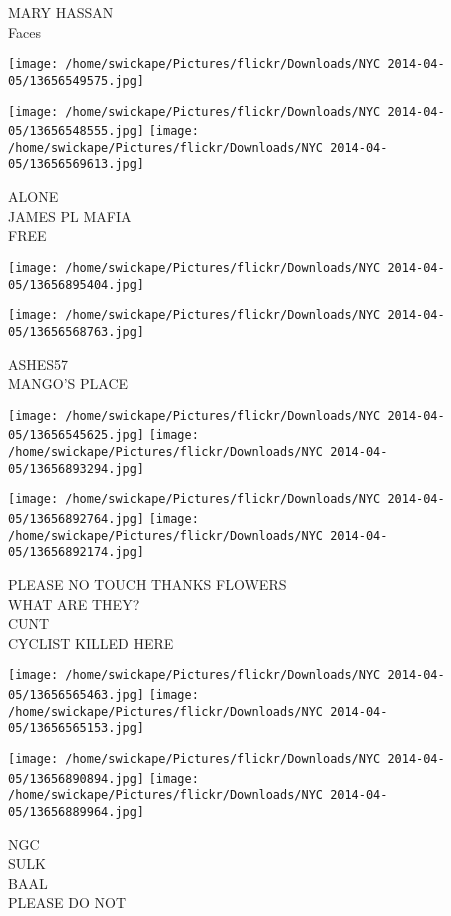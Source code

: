 \documentclass[10pt,letterpaper]{article}
\begin{document}
MARY HASSAN\\
Faces
\pagebreak

\texttt{[image: /home/swickape/Pictures/flickr/Downloads/NYC 2014-04-05/13656549575.jpg]}

\vspace{0.25in}
\texttt{[image: /home/swickape/Pictures/flickr/Downloads/NYC 2014-04-05/13656548555.jpg]}
\texttt{[image: /home/swickape/Pictures/flickr/Downloads/NYC 2014-04-05/13656569613.jpg]}

ALONE\\
JAMES PL MAFIA\\
FREE
\pagebreak

\texttt{[image: /home/swickape/Pictures/flickr/Downloads/NYC 2014-04-05/13656895404.jpg]}

\vspace{0.25in}
\texttt{[image: /home/swickape/Pictures/flickr/Downloads/NYC 2014-04-05/13656568763.jpg]}

ASHES57\\
MANGO'S PLACE
\pagebreak

\texttt{[image: /home/swickape/Pictures/flickr/Downloads/NYC 2014-04-05/13656545625.jpg]}
\texttt{[image: /home/swickape/Pictures/flickr/Downloads/NYC 2014-04-05/13656893294.jpg]}

\texttt{[image: /home/swickape/Pictures/flickr/Downloads/NYC 2014-04-05/13656892764.jpg]}
\texttt{[image: /home/swickape/Pictures/flickr/Downloads/NYC 2014-04-05/13656892174.jpg]}

PLEASE NO TOUCH THANKS FLOWERS\\
WHAT ARE THEY?\\
CUNT\\
CYCLIST KILLED HERE
\pagebreak

\texttt{[image: /home/swickape/Pictures/flickr/Downloads/NYC 2014-04-05/13656565463.jpg]}
\texttt{[image: /home/swickape/Pictures/flickr/Downloads/NYC 2014-04-05/13656565153.jpg]}

\texttt{[image: /home/swickape/Pictures/flickr/Downloads/NYC 2014-04-05/13656890894.jpg]}
\texttt{[image: /home/swickape/Pictures/flickr/Downloads/NYC 2014-04-05/13656889964.jpg]}

NGC\\
SULK\\
BAAL\\
PLEASE DO NOT
\pagebreak
\end{document}
